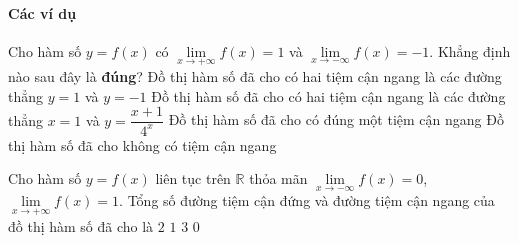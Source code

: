 \paragraph{Các ví dụ}
\begin{vd} %
	Cho hàm số $y=f(x)$ có $\lim\limits_{x\to+\infty} f(x)=1$ và $\lim\limits_{x\to-\infty} f(x)=-1$. Khẳng định nào sau đây là \textbf{đúng}?
	\choice
	{\True Đồ thị hàm số đã cho có hai tiệm cận ngang là các đường thẳng $y=1$ và $y=-1$}
	{Đồ thị hàm số đã cho có hai tiệm cận ngang là các đường thẳng $x=1$ và $y=\dfrac{x+1}{4^x}$}
	{Đồ thị hàm số đã cho có đúng một tiệm cận ngang}
	{Đồ thị hàm số đã cho không có tiệm cận ngang}
\end{vd}	
\begin{vd} %
	Cho hàm số $y=f(x)$ liên tục trên $\mathbb{R}$ thỏa mãn $\lim\limits_{x\to-\infty} f(x)=0$, $\lim\limits_{x\to+\infty} f(x)=1$. Tổng số đường tiệm cận đứng và đường tiệm cận ngang của đồ thị hàm số đã cho là
	\choice
	{\True $2$}
	{$1$}
	{$3$}
	{$0$}
\end{vd}	
		
